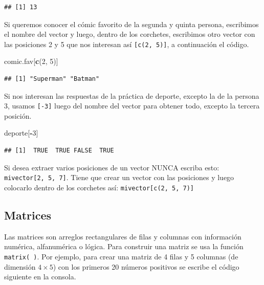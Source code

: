 \documentclass[10pt,]{krantz}
\makeatletter
\newenvironment{Shaded}{\begin{snugshade}}{\end{snugshade}}
\newcommand{\KeywordTok}[1]{\textcolor[rgb]{0.13,0.29,0.53}{\textbf{#1}}}
\newcommand{\DecValTok}[1]{\textcolor[rgb]{0.00,0.00,0.81}{#1}}
\newcommand{\OperatorTok}[1]{\textcolor[rgb]{0.81,0.36,0.00}{\textbf{#1}}}
\newcommand{\NormalTok}[1]{#1}
\newenvironment{kframe}{%
\medskip{}
\setlength{\fboxsep}{.8em}
 \def\at@end@of@kframe{}%
 \ifinner\ifhmode%
  \def\at@end@of@kframe{\end{minipage}}%
  \begin{minipage}{\columnwidth}%
 \fi\fi%
 \def\FrameCommand##1{\hskip\@totalleftmargin \hskip-\fboxsep
 \colorbox{shadecolor}{##1}\hskip-\fboxsep
     \hskip-\linewidth \hskip-\@totalleftmargin \hskip\columnwidth}%
 \MakeFramed {\advance\hsize-\width
   \@totalleftmargin\z@ \linewidth\hsize
   \@setminipage}}%
 {\par\unskip\endMakeFramed%
 \at@end@of@kframe}
\renewenvironment{Shaded}{\begin{kframe}}{\end{kframe}}
\let\BeginKnitrBlock\begin \let\EndKnitrBlock\end
\makeatother
\begin{document}
\begin{verbatim}
## [1] 13
\end{verbatim}

Si queremos conocer el cómic favorito de la segunda y quinta persona,
escribimos el nombre del vector y luego, dentro de los corchetes,
escribimos otro vector con las posiciones 2 y 5 que nos interesan así
\texttt{{[}c(2,\ 5){]}}, a continuación el código.

\begin{Shaded}
\begin{Highlighting}[]
\NormalTok{comic.fav[}\KeywordTok{c}\NormalTok{(}\DecValTok{2}\NormalTok{, }\DecValTok{5}\NormalTok{)]}
\end{Highlighting}
\end{Shaded}

\begin{verbatim}
## [1] "Superman" "Batman"
\end{verbatim}

Si nos interesan las respuestas de la práctica de deporte, excepto la de
la persona 3, usamos \texttt{{[}-3{]}} luego del nombre del vector para
obtener todo, excepto la tercera posición.

\begin{Shaded}
\begin{Highlighting}[]
\NormalTok{deporte[}\OperatorTok{-}\DecValTok{3}\NormalTok{]}
\end{Highlighting}
\end{Shaded}

\begin{verbatim}
## [1]  TRUE  TRUE FALSE  TRUE
\end{verbatim}

\BeginKnitrBlock{rmdwarning}
Si desea extraer varios posiciones de un vector NUNCA escriba esto:
\texttt{mivector{[}2,\ 5,\ 7{]}}. Tiene que crear un vector con las
posiciones y luego colocarlo dentro de los corchetes así:
\texttt{mivector{[}c(2,\ 5,\ 7){]}}
\EndKnitrBlock{rmdwarning}

\subsection{Matrices}\label{matrices}

Las matrices  son arreglos rectangulares de filas y
columnas con información numérica, alfanumérica o lógica. Para construir
una matriz se usa la función \texttt{matrix(\ )}. Por ejemplo, para
crear una matriz de 4 filas y 5 columnas (de dimensión \(4 \times 5\))
con los primeros 20 números positivos se escribe el código siguiente en
la consola.
\end{document}
